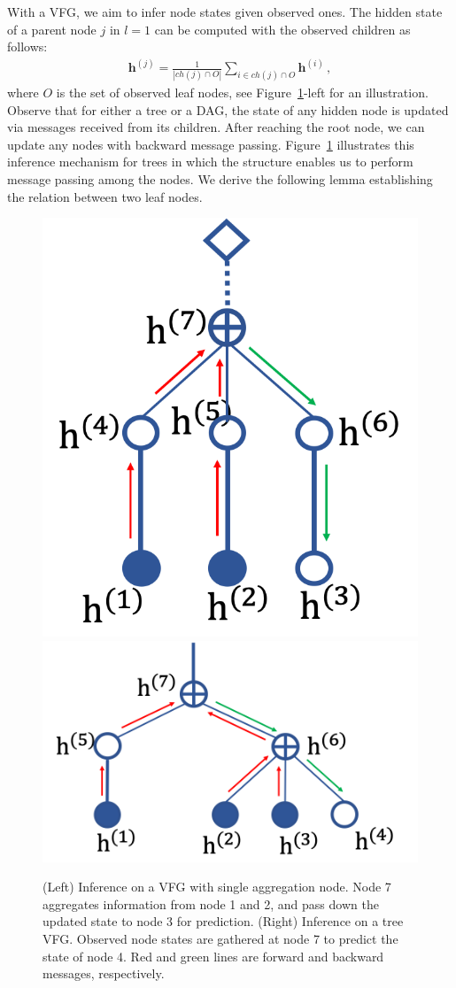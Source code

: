 \documentclass[sigconf, anonymous, review]{acmart}
\theoremstyle{plain}
\theoremstyle{definition}
\theoremstyle{remark}
\begin{document}
With a  VFG, we aim to infer node states given observed ones. The hidden state of a parent node $j$ in $l=1$ can be computed with the observed children as follows:
 \begin{align}\label{eq:aggr_obs_ch}
\mathbf{h}^{(j)}  = \frac{1}{|ch(j) \cap O|}\sum_{i \in ch(j) \cap O} \mathbf{h}^{(i)} \, ,
\end{align}
where $O$ is the set of observed leaf nodes, see Figure~\ref{fig:two_layer_infer}-left for an illustration. 
Observe that for either a tree or a DAG, the state of any hidden node is updated via messages received from its children. After reaching the root node, we can update any nodes with backward message passing.  Figure~\ref{fig:two_layer_infer} illustrates this inference mechanism for trees in which the structure enables us to perform message passing among the nodes. 
We derive the following lemma establishing the relation between two leaf nodes.
\begin{figure}[h]
\begin{center}
 \includegraphics[width=0.3\linewidth]{fig/two_layer_infer.png}
 \includegraphics[width=0.57\linewidth]{fig/tree_infer.png}
\end{center}
\vspace{-0.1in}
 \caption{{\small (Left) Inference on a VFG with single aggregation node. Node 7 aggregates information from node 1 and 2, and  pass down the updated state to node 3 for prediction. (Right) Inference on a tree VFG. Observed node states are gathered at node 7 to predict the state of node 4. Red and green lines are forward and backward messages, respectively.}}
\label{fig:two_layer_infer}
\vspace{-0.1in}
\end{figure}
\end{document}
